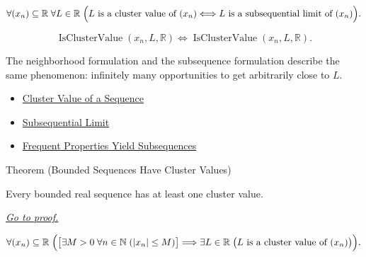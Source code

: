 \begin{remark*}
\[
\forall (x_n)\subseteq\mathbb{R}\;\forall L\in\mathbb{R}\;
\Bigl(
L\text{ is a cluster value of }(x_n)
\Longleftrightarrow
L\text{ is a subsequential limit of }(x_n)
\Bigr).
\]
\end{remark*}

\begin{remark*}
\[
\operatorname{IsClusterValue}(x_n,L,\mathbb{R})
\Longleftrightarrow
\operatorname{IsClusterValue}(x_n,L,\mathbb{R}).
\]
\end{remark*}

\begin{remark*}[Interpretation]
The neighborhood formulation and the subsequence formulation describe the
same phenomenon: infinitely many opportunities to get arbitrarily close to
$L$.
\end{remark*}

\begin{dependencies}
\begin{itemize}
  \item \hyperref[def:cluster-value-sequence]{Cluster Value of a Sequence}
  \item \hyperref[def:subsequential-limit]{Subsequential Limit}
  \item \hyperref[thm:frequent-properties-yield-subsequences]{Frequent Properties Yield Subsequences}
\end{itemize}
\end{dependencies}


\begin{theorembox}{Theorem (Bounded Sequences Have Cluster Values)}
\begin{theorem}
\label{thm:bounded-sequences-have-cluster-values}
Every bounded real sequence has at least one cluster value.

\smallskip
\noindent
\hyperref[prf:bounded-sequences-have-cluster-values]{\textit{Go to proof.}}
\end{theorem}
\end{theorembox}

\begin{remark*}
\[
\forall (x_n)\subseteq\mathbb{R}\;
\Bigl(
  \bigl[\exists M>0\;\forall n\in\mathbb{N}\;(|x_n|\le M)\bigr]
  \Longrightarrow
  \exists L\in\mathbb{R}\;
  \bigl(L\text{ is a cluster value of }(x_n)\bigr)
\Bigr).
\]
\end{remark*}

